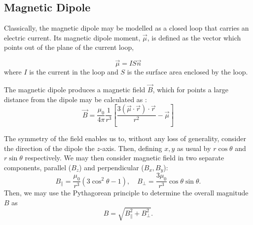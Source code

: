 \subsection{Magnetic Dipole}

Classically, the magnetic dipole may be modelled as a closed loop that carries an
electric current. 
Its magnetic dipole moment, $\vec{\mu}$, is defined as the vector which points out of the plane
of the current loop, 

\begin{equation}
    \vec{\mu} = IS \vec{n}
    \label{eq:dipole_moment}
\end{equation}
where $I$ is the current in the loop and $S$ is the surface area enclosed by the loop. 

The magnetic dipole produces a magnetic field $\vec{B}$, which for points a large distance from the dipole may be calculated as :
$$\vec{B} = \frac{\mu_0}{4\pi} \frac{1}{r^3} \left[\frac{3(\vec{\mu} \cdot \vec{r}) \cdot \vec{r}}{r^2} - \vec{\mu}\right]$$

The symmetry of the field enables us to, without any loss of generality, consider the direction of the dipole the $z$-axis. Then, defining $x,y$ as usual by $r \cos\theta$ and $r \sin\theta$ respectively. We may then consider magnetic field in two separate components, parallel ($B_z$) and perpendicular ($B_x, B_y$): 
$$B_\parallel =\frac{\mu_0}{r^3}(3\cos^2 \theta - 1), \quad B_\perp = \frac{3\mu_0}{r^3}\cos\theta\sin\theta.$$
Then, we may use the Pythagorean principle to determine the overall magnitude $B$ as
$$B = \sqrt{B_\parallel^2 + B_\perp^2}.$$


